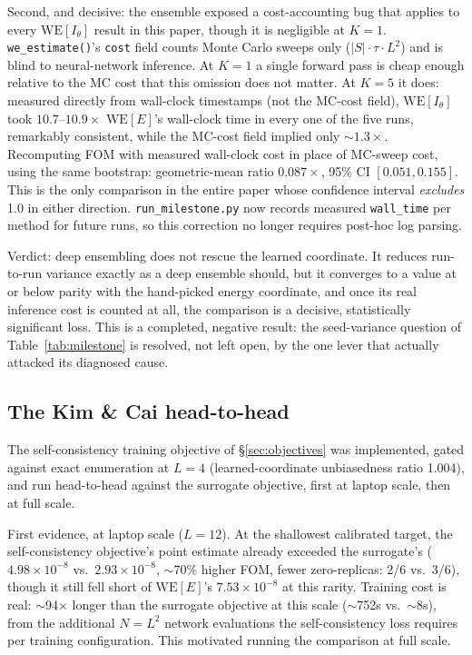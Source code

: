 \documentclass[a4paper,fleqn]{cas-sc}
\begin{document}
Second, and decisive: the ensemble exposed a cost-accounting bug that applies to
	every $\mathrm{WE}[I_\theta]$ result in this paper, though it is negligible at
	$K=1$. \texttt{we\_estimate()}'s \texttt{cost} field counts Monte Carlo sweeps only
($|S|\cdot\tau\cdot L^2$) and is blind to neural-network inference. At $K=1$ a single
forward pass is cheap enough relative to the MC cost that this omission does not matter.
At $K=5$ it does: measured directly from wall-clock timestamps (not the MC-cost field),
$\mathrm{WE}[I_\theta]$ took $10.7$--$10.9\times$ $\mathrm{WE}[E]$'s wall-clock time in
every one of the five runs, remarkably consistent, while the MC-cost field implied
only $\sim\!1.3\times$. Recomputing FOM with measured wall-clock cost in place of MC-sweep
cost, using the same bootstrap: geometric-mean ratio $0.087\times$, 95\% CI $[0.051,
0.155]$. This is the only comparison in the entire paper whose confidence interval
\emph{excludes} 1.0 in either direction. \texttt{run\_milestone.py} now records
measured \texttt{wall\_time} per method for future runs, so this correction no longer
requires post-hoc log parsing.

Verdict: deep ensembling does not rescue the learned coordinate. It reduces
run-to-run variance exactly as a deep ensemble should, but it converges to a value at or
below parity with the hand-picked energy coordinate, and once its real inference cost is
counted at all, the comparison is a decisive, statistically significant loss. This is a
completed, negative result: the seed-variance question of Table~\ref{tab:milestone} is
resolved, not left open, by the one lever that actually attacked its diagnosed cause.

\subsection{The Kim \& Cai head-to-head}\label{sec:kimcai}
The self-consistency training objective of \S\ref{sec:objectives} was implemented, gated
against exact enumeration at $L=4$ (learned-coordinate unbiasedness ratio 1.004), and run
head-to-head against the surrogate objective, first at laptop scale, then at full scale.

First evidence, at laptop scale ($L=12$). At the shallowest calibrated target, the
self-consistency objective's point estimate already exceeded the surrogate's
($4.98\times10^{-8}$ vs.\ $2.93\times10^{-8}$, $\sim$70\% higher FOM, fewer zero-replicas:
2/6 vs.\ 3/6), though it still fell short of $\mathrm{WE}[E]$'s $7.53\times10^{-8}$ at this
rarity. Training cost is real: $\sim$94$\times$ longer than the surrogate objective at this
scale ($\sim$752s vs.\ $\sim$8s), from the additional $N=L^2$ network evaluations the
self-consistency loss requires per training configuration. This motivated running the
comparison at full scale.
\end{document}
